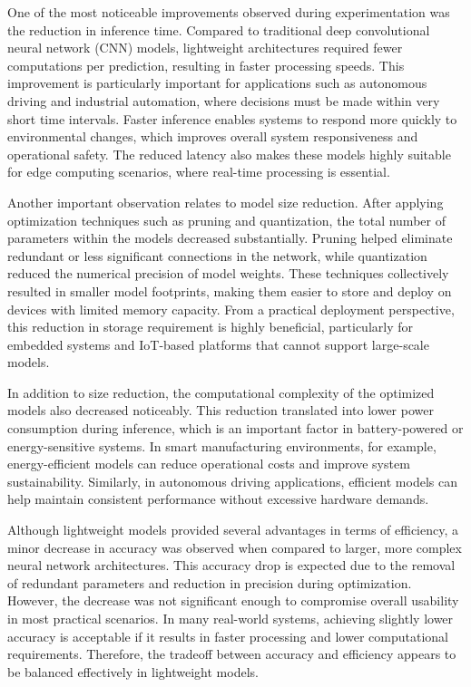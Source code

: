 \documentclass[conference]{IEEEtran}
\begin{document}
One of the most noticeable improvements observed during experimentation was the reduction in inference time. Compared to traditional deep convolutional neural network (CNN) models, lightweight architectures required fewer computations per prediction, resulting in faster processing speeds. This improvement is particularly important for applications such as autonomous driving and industrial automation, where decisions must be made within very short time intervals. Faster inference enables systems to respond more quickly to environmental changes, which improves overall system responsiveness and operational safety. The reduced latency also makes these models highly suitable for edge computing scenarios, where real-time processing is essential.

Another important observation relates to model size reduction. After applying optimization techniques such as pruning and quantization, the total number of parameters within the models decreased substantially. Pruning helped eliminate redundant or less significant connections in the network, while quantization reduced the numerical precision of model weights. These techniques collectively resulted in smaller model footprints, making them easier to store and deploy on devices with limited memory capacity. From a practical deployment perspective, this reduction in storage requirement is highly beneficial, particularly for embedded systems and IoT-based platforms that cannot support large-scale models.

In addition to size reduction, the computational complexity of the optimized models also decreased noticeably. This reduction translated into lower power consumption during inference, which is an important factor in battery-powered or energy-sensitive systems. In smart manufacturing environments, for example, energy-efficient models can reduce operational costs and improve system sustainability. Similarly, in autonomous driving applications, efficient models can help maintain consistent performance without excessive hardware demands.

Although lightweight models provided several advantages in terms of efficiency, a minor decrease in accuracy was observed when compared to larger, more complex neural network architectures. This accuracy drop is expected due to the removal of redundant parameters and reduction in precision during optimization. However, the decrease was not significant enough to compromise overall usability in most practical scenarios. In many real-world systems, achieving slightly lower accuracy is acceptable if it results in faster processing and lower computational requirements. Therefore, the tradeoff between accuracy and efficiency appears to be balanced effectively in lightweight models.
\end{document}
